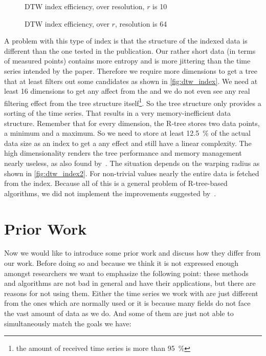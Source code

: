 \begin{figure}
    \centering
    
    \caption{DTW index efficiency, over resolution, $r$ is \num{10}}\label{fig:dtw_index}
\end{figure}

\begin{figure}
    \centering
    
    \caption{DTW index efficiency, over $r$, resolution is \num{64}}\label{fig:dtw_index2}
\end{figure}

A problem with this type of index is that the structure of the indexed data is different than the one tested in the publication. Our rather short data (in terms of measured points) contains more entropy and is more jittering than the time series intended by the paper. Therefore we require more dimensions to get a tree that at least filters out some candidates as shown in \autoref{fig:dtw_index}. We need at least \num{16} dimensions to get any affect from the  and we do not even see any real filtering effect from the tree structure itself\footnote{the amount of received time series is more than \SI{95}{\percent}}. So the tree structure only provides a sorting of the time series. That results in a very memory-inefficient data structure. Remember that for every dimension, the R-tree stores two data points, a minimum and a maximum. So we need to store at least \SI{12.5}{\percent} of the actual data size as an index to get a any effect and still have a linear complexity. The high dimensionality renders the tree performance and memory management nearly useless, as also found by~\cite{rtree_highdim}. The situation depends on the warping radius as shown in \autoref{fig:dtw_index2}. For non-trivial values nearly the entire data is fetched from the index. Because all of this is a general problem of R-tree-based algorithms, we did not implement the improvements suggested by~\cite{LB_Improved}.



\section{Prior Work}
\label{sec:baseline:prior}

Now we would like to introduce some prior work and discuss how they differ from our work. Before doing so and because we think it is not expressed enough amongst researchers we want to emphasize the following point: these methods and algorithms are not bad in general and have their applications, but there are reasons for not using them. Either the time series we work with are just different from the ones which are normally used or it is because many fields do not face the vast amount of data as we do. And some of them are just not able to simultaneously match the goals we have:

